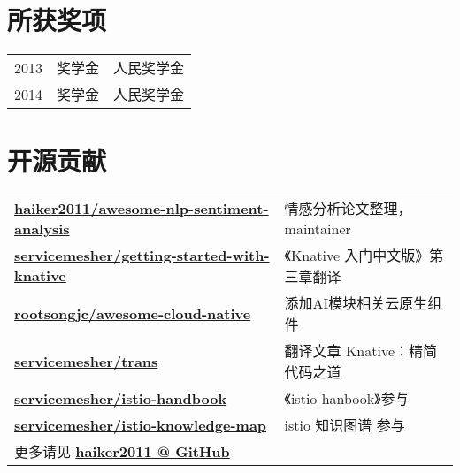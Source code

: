 \documentclass[]{deedy-resume-openfont}
\begin{document}
\begin{minipage}[t]{0.68\textwidth}

\section{所获奖项} 
\begin{tabular}{rll}
2013         & 奖学金  & 人民奖学金 \\
2014         & 奖学金  & 人民奖学金 \\

\end{tabular}
\sectionsep



\section{开源贡献}
\begin{tabular}{ll}
\href{https://github.com/haiker2011/awesome-nlp-sentiment-analysis/commits?author=haiker2011}{\bf haiker2011/awesome-nlp-sentiment-analysis} & 情感分析论文整理，maintainer \\
\href{https://github.com/servicemesher/getting-started-with-knative/commits?author=haiker2011}{\bf servicemesher/getting-started-with-knative} & 《Knative 入门中文版》第三章翻译 \\
\href{https://github.com/rootsongjc/awesome-cloud-native/commits?author=haiker2011}{\bf rootsongjc/awesome-cloud-native} & 添加AI模块相关云原生组件 \\
\href{https://github.com/servicemesher/trans/commits?author=haiker2011}{\bf servicemesher/trans} & 翻译文章 Knative：精简代码之道 \\
\href{https://github.com/servicemesher/istio-handbook/commits?author=haiker2011}{\bf servicemesher/istio-handbook} & 《istio hanbook》参与 \\
\href{https://github.com/servicemesher/istio-knowledge-map/commits?author=haiker2011}{\bf servicemesher/istio-knowledge-map} & istio 知识图谱 参与 \\
更多请见 \href{https://github.com/haiker2011}{\bf haiker2011 @ GitHub} & \\
\end{tabular}
\sectionsep


\end{minipage} 
\end{document}
